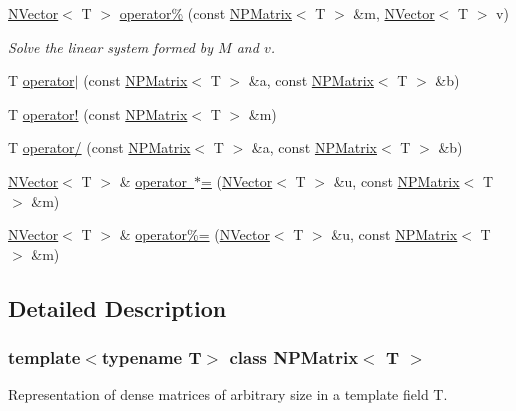 \begin{DoxyCompactItemize}
\mbox{\hyperlink{class_n_vector}{N\+Vector}}$<$ T $>$ \mbox{\hyperlink{class_n_p_matrix_a15e021ffe286b766ab68b83a6e70d891}{operator\%}} (const \mbox{\hyperlink{class_n_p_matrix}{N\+P\+Matrix}}$<$ T $>$ \&m, \mbox{\hyperlink{class_n_vector}{N\+Vector}}$<$ T $>$ v)
\begin{DoxyCompactList}\small\item\em Solve the linear system formed by $ M $ and $ v $. \end{DoxyCompactList}\item 
T \mbox{\hyperlink{class_n_p_matrix_a89e68801a92b42dbb69eb67a4c4cf0da}{operator$\vert$}} (const \mbox{\hyperlink{class_n_p_matrix}{N\+P\+Matrix}}$<$ T $>$ \&a, const \mbox{\hyperlink{class_n_p_matrix}{N\+P\+Matrix}}$<$ T $>$ \&b)
\item 
T \mbox{\hyperlink{class_n_p_matrix_a0f6cfdff016d49df6c2dbb79e85b9842}{operator!}} (const \mbox{\hyperlink{class_n_p_matrix}{N\+P\+Matrix}}$<$ T $>$ \&m)
\item 
T \mbox{\hyperlink{class_n_p_matrix_a12aeb8ceae55cbd9937701cb056b113b}{operator/}} (const \mbox{\hyperlink{class_n_p_matrix}{N\+P\+Matrix}}$<$ T $>$ \&a, const \mbox{\hyperlink{class_n_p_matrix}{N\+P\+Matrix}}$<$ T $>$ \&b)
\item 
\mbox{\hyperlink{class_n_vector}{N\+Vector}}$<$ T $>$ \& \mbox{\hyperlink{class_n_p_matrix_a3ac1836124d15848447935dd5ab657eb}{operator $\ast$=}} (\mbox{\hyperlink{class_n_vector}{N\+Vector}}$<$ T $>$ \&u, const \mbox{\hyperlink{class_n_p_matrix}{N\+P\+Matrix}}$<$ T $>$ \&m)
\item 
\mbox{\hyperlink{class_n_vector}{N\+Vector}}$<$ T $>$ \& \mbox{\hyperlink{class_n_p_matrix_a4eb92336cc8c489af26d55dd36bd7e90}{operator\%=}} (\mbox{\hyperlink{class_n_vector}{N\+Vector}}$<$ T $>$ \&u, const \mbox{\hyperlink{class_n_p_matrix}{N\+P\+Matrix}}$<$ T $>$ \&m)
\end{DoxyCompactItemize}


\subsection{Detailed Description}
\subsubsection*{template$<$typename T$>$\newline
class N\+P\+Matrix$<$ T $>$}

Representation of dense matrices of arbitrary size in a template field {\ttfamily T}. 

